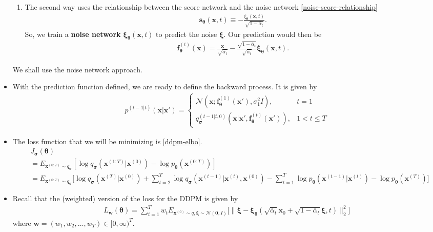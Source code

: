 \documentclass[10pt]{article}
\newcommand{\ve}[1]{\mathbf{#1}}
\newcommand{\ves}[1]{\boldsymbol{#1}}
\newcommand{\mcal}[1]{\mathcal{#1}}
\begin{document}
\begin{itemize}
\begin{enumerate}
    \item The second way uses the relationship between the score network and the noise network \eqref{noise-score-relationship}
    \begin{align*}
      \ve{s}_{\ves{\theta}}(\ve{x}, t) \equiv -\frac{\xi_{\ves{\theta}}(\ve{x}, t)}{\sqrt{1 - \overline{\alpha}_t}}.
    \end{align*}
    So, we train a {\bf noise network} $\ves{\xi}_{\ves{\theta}}(\ve{x},t)$ to predict the noise $\ves{\xi}$. Our prediction would then be
    \begin{align*}
      \ve{f}^{(t)}_{\ves{\theta}}(\ve{x}) = \frac{\ve{x}}{\sqrt{\overline{\alpha}_t}} - \frac{\sqrt{1 - \overline{\alpha}_t}}{{\sqrt{\overline{\alpha}_t}} } \ves{\xi}_{\ves{\theta}}(\ve{x}, t).
    \end{align*}
  \end{enumerate}  
  We shall use the noise network approach.
  
  \item With the prediction function defined, we are ready to define the backward process. It is given by
  \begin{align*}
    p^{(t-1|t)}(\ve{x}|\ve{x}') =
    \begin{cases}
      \mcal{N}(\ve{x}; \ve{f}_{\ves{\theta}}^{(1)}(\ve{x}'), \sigma^2_1 I), & t = 1 \\
      q_{\ves{\sigma}}^{(t-1|t,0)}(\ve{x}|\ve{x}',\ve{f}^{(t)}_{\ves{\theta}}(\ve{x}')), & 1 < t \leq T
    \end{cases}
  \end{align*}

  \item The loss function that we will be minimizing is \eqref{ddpm-elbo}.
  \begin{align*}
    &J_{\ves{\sigma}}(\ves{\theta}) \\
    &= E_{\ve{x}^{(0:T)} \sim q_{\ves{\sigma}}} [ \log q_{\ves{\sigma}}(\ve{x}^{(1:T)}|\ve{x}^{(0)}) - \log p_{\ves{\theta}}(\ve{x}^{(0:T)}) ] \\
    &= E_{\ve{x}^{(0:T)} \sim q_{\ves{\sigma}}} \bigg[ 
      \log q_{\ves{\sigma}}(\ve{x}^{(T)}|\ve{x}^{(0)})
      + \sum_{t=2}^T \log q_{\ves{\sigma}}(\ve{x}^{(t-1)}|\ve{x}^{(t)},\ve{x}^{(0)}) 
      - \sum_{t=1}^T \log p_{\ves{\theta}}(\ve{x}^{(t-1)}|\ve{x}^{(t)}) 
      - \log p_{\ves{\theta}}(\ves{x}^{(T)})
    \bigg]
  \end{align*}

  \item Recall that the (weighted) version of the loss for the DDPM is given by
  \begin{align*}
    L_{\ve{w}}(\ves{\theta})
    = \sum_{t=1}^T w_t E_{\ve{x}^{(0)} \sim q, \ves{\xi} \sim \mcal{N}(\ve{0},I)} \Big[ 
      \big\| \ves{\xi} - \ves{\xi}_{\ves{\theta}}(\sqrt{\overline{\alpha}_t} \ve{x}_0 + \sqrt{1 - \overline{\alpha}_t} \ves{\xi} , t) \big\|^2_2
    \Big]
  \end{align*}
  where $\ve{w} = (w_1, w_2, \dotsc, w_T) \in [0,\infty)^T$.


\end{itemize}
\end{document}

